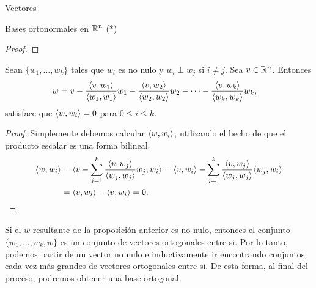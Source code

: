 \begin{chapter}{Vectores}
\begin{section}{Bases ortonormales en $\mathbb R^n$ (*)}
\begin{proof}
    \end{proof}


  
    \begin{proposicion}\label{th-gram-scmidt-rn}
        Sean $\{w_1,\ldots,w_k\}$ tales que $w_i$  es no nulo y  $w_i \perp w_j$ si $i\ne j$. Sea $v \in \mathbb R^n$. Entonces
        \begin{align*}
         w&= v - \frac{\langle v,w_1\rangle}{\langle w_1,w_1\rangle}w_1- \frac{\langle v,w_2\rangle}{\langle w_2,w_2\rangle}w_2 - \cdots - \frac{\langle v,w_{k}\rangle}{\langle w_{k},w_{k}\rangle}w_{k},
        \end{align*}
        satisface que $\langle w, w_i\rangle =0$ para $0 \le i \le k$.
    \end{proposicion} 
    \begin{proof}
        Simplemente debemos calcular  $\langle w, w_i\rangle$,  utilizando el hecho de que el producto escalar es una forma bilineal. 
        \begin{align*}
        \langle w, w_i \rangle &= \langle  v - \sum_{j = 1}^{k} \frac{\langle v,w_{j}\rangle}{\langle w_{j},w_{j}\rangle}w_{j} , w_i \rangle 
        = \langle v, w_i\rangle -  \sum_{j = 1}^{k} \frac{\langle v,w_{j}\rangle}{\langle w_{j},w_{j}\rangle}\langle w_{j} , w_i \rangle \\
        &=  \langle v, w_i\rangle -  \langle v, w_i\rangle = 0.
        \end{align*}
    \end{proof}

\begin{obs*} Si el $w$  resultante de la proposición anterior es no nulo,  entonces el conjunto  $\{w_1,\ldots,w_k,w\}$ es un conjunto de vectores ortogonales entre si. Por lo tanto, podemos partir de un vector no  nulo e inductivamente ir encontrando  conjuntos cada vez más grandes de vectores ortogonales entre si. De esta forma, al final del proceso, podremos obtener una base ortogonal. 
\end{obs*}



\end{section}
\end{chapter}
